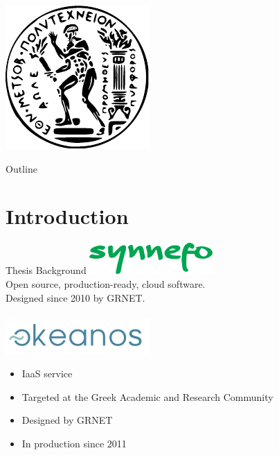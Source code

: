 \begin{frame}[plain]
\titlepage
\begin{center}
\includegraphics[scale=0.6]{images/pyrforos.pdf}
\end{center}
\end{frame}


\begin{frame}[t]{Outline}
\setcounter{tocdepth}{1}
\tableofcontents
\end{frame}

\section{Introduction}
\begin{frame}{Thesis Background}
\includegraphics[height=0.075\textheight]{images/synnefo-logo.png} \\
    Open source, production-ready, cloud software.\\
    Designed since 2010 by GRNET.
\hfill \\
\hfill \\
\includegraphics[height=0.075\textheight]{images/okeanos-logo.png}
    \begin{itemize}
        \item IaaS service
        \item Targeted at the Greek Academic and Research Community
        \item Designed by GRNET
        \item In production since 2011
    \end{itemize}
\end{frame}
